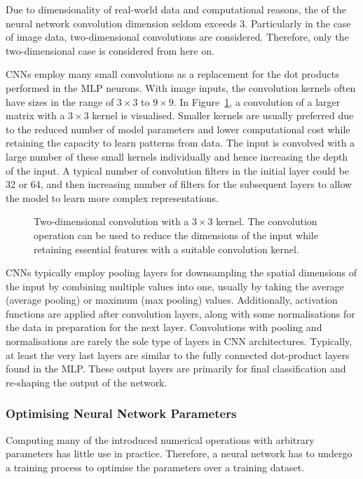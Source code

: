 Due to dimensionality of real-world data and computational reasons, the of the neural network convolution dimension seldom exceeds 3.
Particularly in the case of image data, two-dimensional convolutions are considered.
Therefore, only the two-dimensional case is considered from here on.

CNNs employ many small convolutions as a replacement for the dot products performed in the MLP neurons.
With image inputs, the convolution kernels often have sizes in the range of $3 \times 3$ to $9 \times 9$.
In Figure~\ref{fig:2dconv}, a convolution of a larger matrix with a $3 \times 3$ kernel is visualised.
Smaller kernels are usually preferred due to the reduced number of model parameters and lower computational cost while retaining the capacity to learn patterns from data.
The input is convolved with a large number of these small kernels individually and hence increasing the depth of the input.
A typical number of convolution filters in the initial layer could be 32 or 64, and then increasing number of filters for the subsequent layers to allow the model to learn more complex representations.
\begin{figure}[H]
    \centering
    
    \caption{\label{fig:2dconv}Two-dimensional convolution with a $3 \times 3$ kernel.
    The convolution operation can be used to reduce the dimensions of the input while retaining essential features with a suitable convolution kernel.}
\end{figure}

CNNs typically employ pooling layers for downsampling the spatial dimensions of the input by combining multiple values into one, usually by taking the average (average pooling) or maximum (max pooling) values.
Additionally, activation functions are applied after convolution layers, along with some normalisations for the data in preparation for the next layer.
Convolutions with pooling and normalisations are rarely the sole type of layers in CNN architectures.
Typically, at least the very last layers are similar to the fully connected dot-product layers found in the MLP\@.
These output layers are primarily for final classification and re-shaping the output of the network.

\subsubsection{Optimising Neural Network Parameters}\label{subsubsec:optimisation}
Computing many of the introduced numerical operations with arbitrary parameters has little use in practice.
Therefore, a neural network has to undergo a training process to optimise the parameters over a training dataset.

